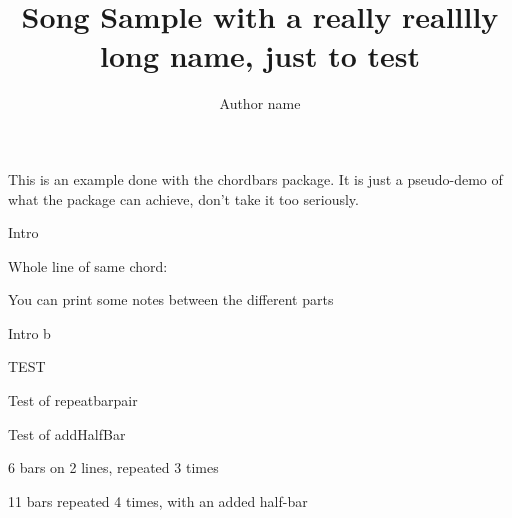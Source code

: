 \documentclass[11pt]{article}
\title{Song Sample with a really realllly long name, just to test}
\author{Author name}
\begin{document}


\countbarsYes

\songtitle

This is an example done with the chordbars package.
It is just a pseudo-demo of what the package can achieve, don't take it too seriously.



\begin{chordbar}{4}{Intro}
\end{chordbar}


Whole line of same chord:


You can print some notes between the different parts

\def\barsize{1.8}%
\def\chordFontSize{\huge\bfseries}
\begin{chordbar}[3]{6}{Intro b}
\repeatBar
{}
\end{chordbar}


\def\barsize{1.4}%
\begin{chordbar}[2]{4}{TEST}
\repeatBar
\end{chordbar}

\def\barsize{2}
\def\chordFontSize{\Large\bfseries}
\begin{chordbar}{5}{Test of repeatbarpair}
\repeatBarPair
{}
\end{chordbar}


\begin{chordbar}{4}{Test of addHalfBar}
\repeatBar
{}
\end{chordbar}


\begin{chordbar}[3]{6}{6 bars on 2 lines, repeated 3 times}
\repeatBar
{}
\repeatBar
\end{chordbar}

\begin{chordbar}[4]{11}{11 bars repeated 4 times, with an added half-bar}
\newchordline
{}
\repeatBar
\repeatBar
\repeatBar
{}
\repeatBar
\repeatBar
{}
\end{chordbar}
\end{document}

